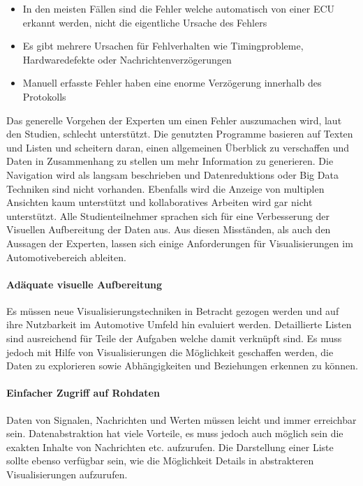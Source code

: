 \documentclass[draft=false
              ,paper=a4
              ,twoside=false
              ,fontsize=11pt
              ,headsepline
              ,BCOR10mm
              ,DIV11
              ]{scrbook}
\begin{document}
\begin{itemize}
  \item In den meisten Fällen sind die Fehler welche automatisch von einer ECU erkannt werden, nicht die eigentliche Ursache des Fehlers
  \item Es gibt mehrere Ursachen für Fehlverhalten wie Timingprobleme, Hardwaredefekte oder Nachrichtenverzögerungen
  \item Manuell erfasste Fehler haben eine enorme Verzögerung innerhalb des Protokolls 
\end{itemize}

Das generelle Vorgehen der Experten um einen Fehler auszumachen wird, laut den Studien, schlecht unterstützt. Die genutzten Programme basieren auf Texten und Listen und scheitern daran, einen allgemeinen Überblick zu verschaffen und Daten in Zusammenhang zu stellen um mehr Information zu generieren. Die Navigation wird als langsam beschrieben und Datenreduktions oder Big Data Techniken sind nicht vorhanden. Ebenfalls wird die Anzeige von multiplen Ansichten kaum unterstützt und kollaboratives Arbeiten wird gar nicht unterstützt. Alle Studienteilnehmer sprachen sich für eine Verbesserung der Visuellen Aufbereitung der Daten aus. Aus diesen Misständen, als auch den Aussagen der Experten, lassen sich einige Anforderungen für Visualisierungen im Automotivebereich ableiten. 

\paragraph{Adäquate visuelle Aufbereitung} %
\label{par:adaquate_visuelle_aufbereitung}
Es müssen neue Visualisierungstechniken in Betracht gezogen werden und auf ihre Nutzbarkeit im Automotive Umfeld hin evaluiert werden. Detaillierte Listen sind ausreichend für Teile der Aufgaben welche damit verknüpft sind. Es muss jedoch mit Hilfe von Visualisierungen die Möglichkeit geschaffen werden, die Daten zu explorieren sowie Abhängigkeiten und Beziehungen erkennen zu können. 
\paragraph{Einfacher Zugriff auf Rohdaten} %
\label{par:einfacher_zugriff_auf_rohdaten}
Daten von Signalen, Nachrichten und Werten müssen leicht und immer erreichbar sein. Datenabstraktion hat viele Vorteile, es muss jedoch auch möglich sein die exakten Inhalte von Nachrichten etc. aufzurufen. Die Darstellung einer Liste sollte ebenso verfügbar sein, wie die Möglichkeit Details in abstrakteren Visualisierungen aufzurufen.
\end{document}

